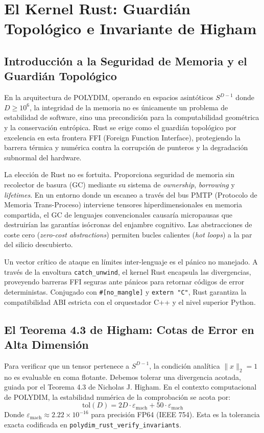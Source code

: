 \chapter{El Kernel Rust: Guardián Topológico e Invariante de Higham}

\section{Introducción a la Seguridad de Memoria y el Guardián Topológico}

En la arquitectura de POLYDIM, operando en espacios asintóticos $S^{D-1}$ donde $D \ge 10^6$, la integridad de la memoria no es únicamente un problema de estabilidad de software, sino una precondición para la computabilidad geométrica y la conservación entrópica. Rust se erige como el guardián topológico por excelencia en esta frontera FFI (Foreign Function Interface), protegiendo la barrera térmica y numérica contra la corrupción de punteros y la degradación subnormal del hardware.

La elección de Rust no es fortuita. Proporciona seguridad de memoria sin recolector de basura (GC) mediante su sistema de \textit{ownership}, \textit{borrowing} y \textit{lifetimes}. En un entorno donde un escaneo a través del bus PMTP (Protocolo de Memoria Trans-Proceso) interviene tensores hiperdimensionales en memoria compartida, el GC de lenguajes convencionales causaría micropausas que destruirían las garantías isócronas del enjambre cognitivo. Las abstracciones de coste cero (\textit{zero-cost abstractions}) permiten bucles calientes (\textit{hot loops}) a la par del silicio descubierto.

Un vector crítico de ataque en límites inter-lenguaje es el pánico no manejado. A través de la envoltura \texttt{catch\_unwind}, el kernel Rust encapsula las divergencias, proveyendo barreras FFI seguras ante pánicos para retornar códigos de error deterministas. Conjugado con \texttt{\#[no\_mangle]} y \texttt{extern "C"}, Rust garantiza la compatibilidad ABI estricta con el orquestador C++ y el nivel superior Python.

\section{El Teorema 4.3 de Higham: Cotas de Error en Alta Dimensión}

Para verificar que un tensor pertenece a $S^{D-1}$, la condición analítica $\lVert x \rVert_2 = 1$ no es evaluable en coma flotante. Debemos tolerar una divergencia acotada, guiada por el Teorema 4.3 de Nicholas J. Higham. En el contexto computacional de POLYDIM, la estabilidad numérica de la comprobación se acota por:
\begin{equation}
\text{tol}(D) = 2D \cdot \varepsilon_{\text{mach}} + 50 \cdot \varepsilon_{\text{mach}}
\end{equation}
Donde $\varepsilon_{\text{mach}} \approx 2.22 \times 10^{-16}$ para precisión FP64 (IEEE 754). Esta es la tolerancia exacta codificada en \texttt{polydim\_rust\_verify\_invariants}.

